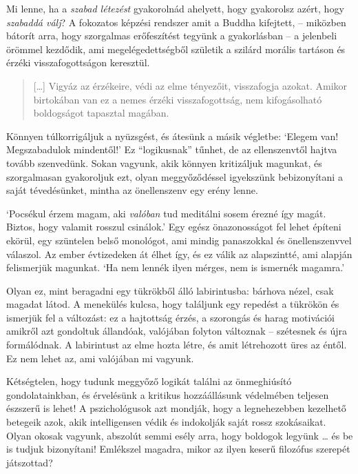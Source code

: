 \clearpage
\normalpagelayout

Mi lenne, ha a \emph{szabad létezést} gyakorolnád ahelyett, hogy
gyakorolsz azért, hogy \emph{szabaddá válj}? A fokozatos képzési
rendszer amit a Buddha kifejtett, -- miközben bátorít arra, hogy
szorgalmas erőfeszítést tegyünk a gyakorlásban -- a jelenbeli örömmel
kezdődik, ami megelégedettségből születik a szilárd morális tartáson és
érzéki visszafogottságon keresztül.

\begin{quote}
{[}\ldots{]} Vigyáz az érzékeire, védi az elme tényezőit, visszafogja
azokat. Amikor birtokában van ez a nemes érzéki visszafogottság, nem
kifogásolható boldogságot tapasztal magában.

\bigskip

\end{quote}


Könnyen túlkorrigáljuk a nyüzsgést, és átesünk a másik végletbe: `Elegem
van! Megszabadulok mindentől!' Ez ``logikusnak'' tűnhet, de az
ellenszenvtől hajtva tovább szenvedünk. Sokan vagyunk, akik könnyen
kritizáljuk magunkat, és szorgalmasan gyakoroljuk ezt, olyan
meggyőződéssel igyekszünk bebizonyítani a saját tévedésünket, mintha az
önellenszenv egy erény lenne.

`Pocsékul érzem magam, aki \emph{valóban} tud meditálni sosem érezné így
magát. Biztos, hogy valamit rosszul csinálok.' Egy egész önazonosságot
fel lehet építeni ekörül, egy szüntelen belső monológot, ami mindig
panaszokkal és önellenszenvvel válaszol. Az ember évtizedeken át élhet
így, és ez válik az alapszintté, ami alapján felismerjük magunkat. `Ha
nem lennék ilyen mérges, nem is ismernék magamra.'

Olyan ez, mint beragadni egy tükrökből álló labirintusba: bárhova
nézel, csak magadat látod. A menekülés kulcsa, hogy találjunk egy
repedést a tükrökön és ismerjük fel a változást: ez a hajtottság érzés, a
szorongás és harag motivációi amikről azt gondoltuk állandóak, valójában
folyton változnak -- szétesnek és újra formálódnak. A labirintust az
elme hozta létre, és amit létrehozott üres az éntől. Ez nem lehet az,
ami valójában mi vagyunk.

Kétségtelen, hogy tudunk meggyőző logikát találni az önmeghiúsító
gondolatainkban, és érvelésünk a kritikus hozzáállásunk védelmében
teljesen észszerű is lehet! A pszichológusok azt mondják, hogy a
legnehezebben kezelhető betegeik azok, akik intelligensen védik és
indokolják saját rossz szokásaikat. Olyan okosak vagyunk, abszolút semmi
esély arra, hogy boldogok legyünk \ldots{} és be is tudjuk bizonyítani!
Emlékszel magadra, mikor az ilyen keserű filozófus szerepét játszottad?

